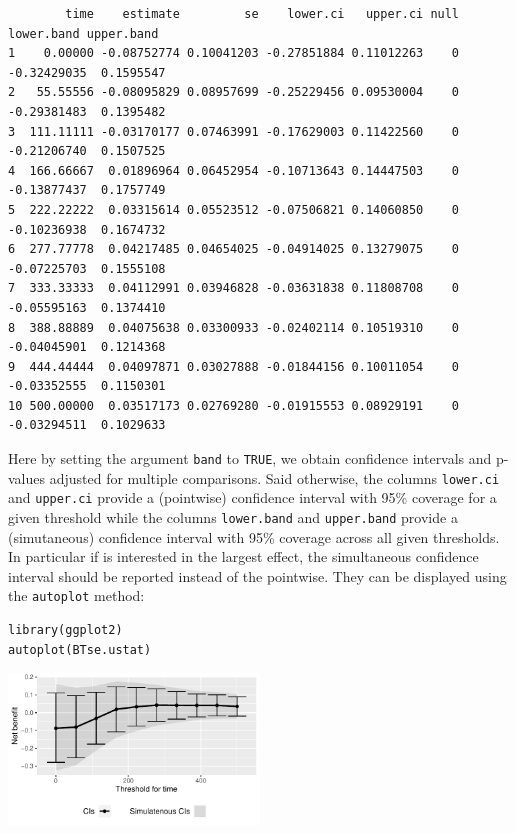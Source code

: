 \documentclass[12pt]{article}
\begin{document}
\begin{verbatim}
        time    estimate         se    lower.ci   upper.ci null  lower.band upper.band
1    0.00000 -0.08752774 0.10041203 -0.27851884 0.11012263    0 -0.32429035  0.1595547
2   55.55556 -0.08095829 0.08957699 -0.25229456 0.09530004    0 -0.29381483  0.1395482
3  111.11111 -0.03170177 0.07463991 -0.17629003 0.11422560    0 -0.21206740  0.1507525
4  166.66667  0.01896964 0.06452954 -0.10713643 0.14447503    0 -0.13877437  0.1757749
5  222.22222  0.03315614 0.05523512 -0.07506821 0.14060850    0 -0.10236938  0.1674732
6  277.77778  0.04217485 0.04654025 -0.04914025 0.13279075    0 -0.07225703  0.1555108
7  333.33333  0.04112991 0.03946828 -0.03631838 0.11808708    0 -0.05595163  0.1374410
8  388.88889  0.04075638 0.03300933 -0.02402114 0.10519310    0 -0.04045901  0.1214368
9  444.44444  0.04097871 0.03027888 -0.01844156 0.10011054    0 -0.03352555  0.1150301
10 500.00000  0.03517173 0.02769280 -0.01915553 0.08929191    0 -0.03294511  0.1029633
\end{verbatim}

Here by setting the argument \texttt{band} to \texttt{TRUE}, we obtain confidence
intervals and p-values adjusted for multiple comparisons. Said
otherwise, the columns \texttt{lower.ci} and \texttt{upper.ci} provide a (pointwise)
confidence interval with 95\% coverage for a given threshold while the
columns \texttt{lower.band} and \texttt{upper.band} provide a (simutaneous)
confidence interval with 95\% coverage across all given thresholds. In
particular if is interested in the largest effect, the simultaneous
confidence interval should be reported instead of the pointwise. They
can be displayed using the \texttt{autoplot} method:
\lstset{language=r,label= ,caption= ,captionpos=b,numbers=none}
\begin{lstlisting}
library(ggplot2)
autoplot(BTse.ustat)
\end{lstlisting}

\begin{center}
\includegraphics[width=0.5\textwidth]{./figures/gg-sensitivity1.pdf}
\end{center}
\end{document}
